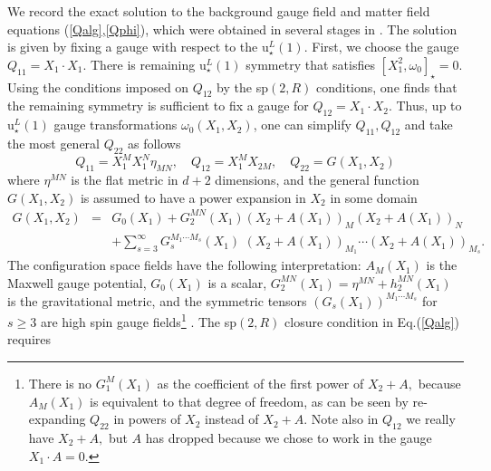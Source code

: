 \documentclass[a4paper,12pt]{article}
\begin{document}
We record the exact solution to the background gauge field and matter field
equations (\ref{Qalg},\ref{Qphi}), which were obtained in several stages in 
\cite{field2T}\cite{highspin}\cite{NCSp}. The solution is given by fixing a
gauge with respect to the u$_{\star }^{L}\left( 1\right) .$ First, we choose
the gauge $Q_{11}=X_{1}\cdot X_{1}$. There is remaining u$_{\star
}^{L}\left( 1\right) $ symmetry that satisfies $\left[ X_{1}^{2},\omega _{0}%
\right] _{\star }=0.$ Using the conditions imposed on $Q_{12}$ by the sp$%
\left( 2,R\right) $ conditions, one finds that the remaining symmetry is
sufficient to fix a gauge for $Q_{12}=X_{1}\cdot X_{2}.$ Thus, up to u$%
_{\star }^{L}\left( 1\right) $ gauge transformations $\omega _{0}\left(
X_{1},X_{2}\right) $, one can simplify $Q_{11},Q_{12}$ and take the most
general $Q_{22}$ as follows 
\begin{equation}
Q_{11}=X_{1}^{M}X_{1}^{N}\eta _{MN},\quad Q_{12}=X_{1}^{M}X_{2M},\quad
Q_{22}=G\left( X_{1},X_{2}\right)  \label{bkg1}
\end{equation}
where $\eta ^{MN}$ is the flat metric in $d+2$ dimensions, and the general
function $G\left( X_{1},X_{2}\right) $ is assumed to have a power expansion
in $X_{2}$ in some domain 
\begin{eqnarray}
G\left( X_{1},X_{2}\right) &=&G_{0}\left( X_{1}\right) +G_{2}^{MN}\left(
X_{1}\right) \left( X_{2}+A\left( X_{1}\right) \right) _{M}\left(
X_{2}+A\left( X_{1}\right) \right) _{N}  \nonumber \\
&&+\sum_{s=3}^{\infty }G_{s}^{M_{1}\cdots M_{s}}\left( X_{1}\right)
\,\,\left( X_{2}+A\left( X_{1}\right) \right) _{M_{1}}\cdots \left(
X_{2}+A\left( X_{1}\right) \right) _{M_{s}}.  \label{bkg3}
\end{eqnarray}
The configuration space fields have the following interpretation: $%
A_{M}\left( X_{1}\right) $ is the Maxwell gauge potential, $G_{0}\left(
X_{1}\right) $ is a scalar, $G_{2}^{MN}\left( X_{1}\right) =\eta
^{MN}+h_{2}^{MN}\left( X_{1}\right) $ is the gravitational metric, and the
symmetric tensors $\left( G_{s}\left( X_{1}\right) \right) ^{M_{1}\cdots
M_{s}}$ for $s\geq 3$ are high spin gauge fields\footnote{%
There is no $G_{1}^{M}\left( X_{1}\right) $ as the coefficient of the first
power of $X_{2}+A,$ because $A_{M}\left( X_{1}\right) $ is equivalent to
that degree of freedom, as can be seen by re-expanding $Q_{22}$ in powers of 
$X_{2}$ instead of $X_{2}+A.$ Note also in $Q_{12}$ we really have $X_{2}+A,$
but $A$ has dropped because we chose to work in the gauge $X_{1}\cdot A=0.$}%
. The sp$\left( 2,R\right) $ closure condition in Eq.(\ref{Qalg}) requires
\end{document}
